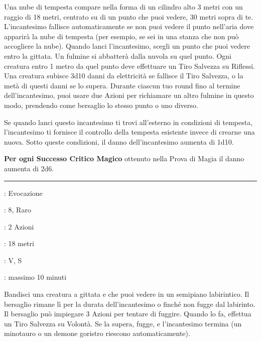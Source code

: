 \begin{multicols}{2}
Una nube di tempesta compare nella forma di un cilindro alto 3 metri con un raggio di 18 metri, centrato su di un punto che puoi vedere, 30 metri sopra di te. L'incantesimo fallisce automaticamente se non puoi vedere il punto nell'aria dove apparirà la nube di tempesta (per esempio, se sei in una stanza che non può accogliere la nube). Quando lanci l'incantesimo, scegli un punto che puoi vedere entro la gittata. Un fulmine si abbatterà dalla nuvola su quel punto. Ogni creatura entro 1 metro da quel punto deve effettuare un Tiro Salvezza su Riflessi. Una creatura subisce 3d10 danni da elettricità se fallisce il Tiro Salvezza, o la metà di questi danni se lo supera. Durante ciascun tuo round fino al termine dell'incantesimo, puoi usare due Azioni per richiamare un altro fulmine in questo modo, prendendo come bersaglio lo stesso punto o uno diverso.

Se quando lanci questo incantesimo ti trovi all'esterno in condizioni di tempesta, l'incantesimo ti fornisce il controllo della tempesta esistente invece di crearne una nuova. Sotto queste condizioni, il danno dell'incantesimo aumenta di 1d10.

\textbf{Per ogni Successo Critico Magico} ottenuto nella Prova di Magia il danno aumenta di 2d6.

\smallskip\noindent\rule{\linewidth}{2pt} \hypertarget{Labirinto}{}\medskip{}
\noindent
\begin{description}[noitemsep, topsep=0pt, parsep=0pt, partopsep=0pt, leftmargin=0cm, labelwidth=2.8cm]
	\item[\textbf{Lista di Magia}]: Evocazione
	\item[\textbf{Livello}]: 8, Raro
	\item[\textbf{T. di Lancio}]: 2 Azioni
	\item[\textbf{Gittata}]: 18 metri
	\item[\textbf{Componenti}]: V, S
	\item[\textbf{Durata}]: massimo 10 minuti
\end{description}

Bandisci una creatura a gittata e che puoi vedere in un semipiano labirintico. Il bersaglio rimane lì per la durata dell'incantesimo o finché non fugge dal labirinto. Il bersaglio può impiegare 3 Azioni per tentare di fuggire. Quando lo fa, effettua un Tiro Salvezza su Volontà. Se la supera, fugge, e l'incantesimo termina (un minotauro o un demone goristro riescono automaticamente).


\end{multicols}
